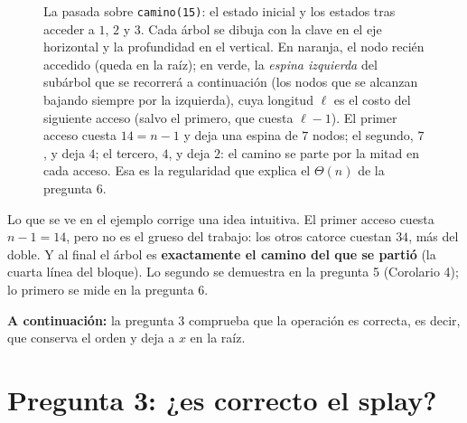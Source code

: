 \documentclass[11pt]{article}
\begin{document}
\begin{figure}[!ht]
\caption{La pasada sobre \texttt{camino(15)}: el estado inicial y los estados tras acceder a $1$, $2$ y $3$.
Cada árbol se dibuja con la clave en el eje horizontal y la profundidad en el vertical. En naranja, el nodo
recién accedido (queda en la raíz); en verde, la \emph{espina izquierda} del subárbol que se recorrerá a continuación
(los nodos que se alcanzan bajando siempre por la izquierda), cuya longitud $\ell$ es el costo del siguiente acceso (salvo el primero, que cuesta $\ell-1$).
El primer acceso cuesta $14=n-1$ y deja una espina de $7$ nodos; el segundo, $7$, y deja $4$; el tercero, $4$, y deja $2$:
el camino se parte por la mitad en cada acceso. Esa es la regularidad que explica el $\Theta(n)$ de la pregunta 6.}
\label{fig:estados}
\end{figure}

Lo que se ve en el ejemplo corrige una idea intuitiva. El primer acceso cuesta $n-1=14$, pero no es el grueso del
trabajo: los otros catorce cuestan $34$, más del doble. Y al final el árbol es \textbf{exactamente el camino del que se
partió} (la cuarta línea del bloque). Lo segundo se demuestra en la pregunta 5 (Corolario 4); lo primero se mide en la pregunta 6.

\textbf{A continuación:} la pregunta 3 comprueba que la operación es correcta, es decir, que conserva el orden y deja a $x$ en la raíz.

\section{Pregunta 3: ¿es correcto el splay?}
\end{document}
